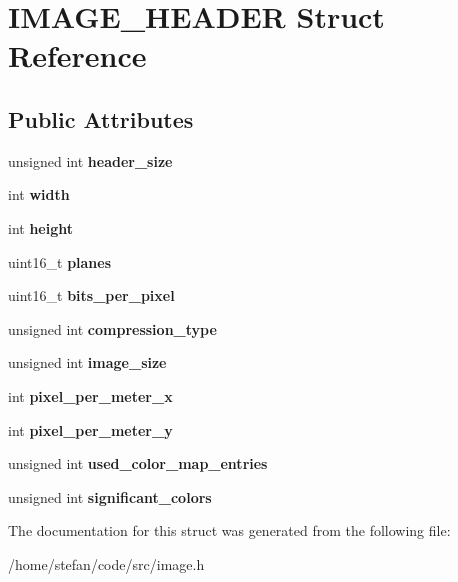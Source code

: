 \hypertarget{structIMAGE__HEADER}{}\section{I\+M\+A\+G\+E\+\_\+\+H\+E\+A\+D\+ER Struct Reference}
\label{structIMAGE__HEADER}
\subsection*{Public Attributes}
\begin{DoxyCompactItemize}
\item 
\mbox{\label{structIMAGE__HEADER_a9a4b334752a6cefe8ab3d670c1b9cf06}} 
unsigned int {\bfseries header\+\_\+size}
\item 
\mbox{\label{structIMAGE__HEADER_a8b50b2758ee52dde72bc8d09f00ec5e6}} 
int {\bfseries width}
\item 
\mbox{\label{structIMAGE__HEADER_acaaebfd532c73cc1a23132eb7b904684}} 
int {\bfseries height}
\item 
\mbox{\label{structIMAGE__HEADER_a965779fd34740d2fd1e53fa0420934b4}} 
uint16\+\_\+t {\bfseries planes}
\item 
\mbox{\label{structIMAGE__HEADER_a39639dccddac3cd2ff5f6a0acfe4f0e7}} 
uint16\+\_\+t {\bfseries bits\+\_\+per\+\_\+pixel}
\item 
\mbox{\label{structIMAGE__HEADER_a5d68c763f144d0e24ae65768a43b4a01}} 
unsigned int {\bfseries compression\+\_\+type}
\item 
\mbox{\label{structIMAGE__HEADER_a1214b873edf18e7182b8dc6c82f3a85e}} 
unsigned int {\bfseries image\+\_\+size}
\item 
\mbox{\label{structIMAGE__HEADER_a88c15abd1de4f3999bf5947b447c83ad}} 
int {\bfseries pixel\+\_\+per\+\_\+meter\+\_\+x}
\item 
\mbox{\label{structIMAGE__HEADER_a1510e52b3237efd9d57a144493292212}} 
int {\bfseries pixel\+\_\+per\+\_\+meter\+\_\+y}
\item 
\mbox{\label{structIMAGE__HEADER_ac5677e8243f351bdf6afb909267f566c}} 
unsigned int {\bfseries used\+\_\+color\+\_\+map\+\_\+entries}
\item 
\mbox{\label{structIMAGE__HEADER_a5f1fb2a8d4c6946dc16a2f83fe45326a}} 
unsigned int {\bfseries significant\+\_\+colors}
\end{DoxyCompactItemize}


The documentation for this struct was generated from the following file\+:\begin{DoxyCompactItemize}
\item 
/home/stefan/code/src/image.\+h\end{DoxyCompactItemize}
